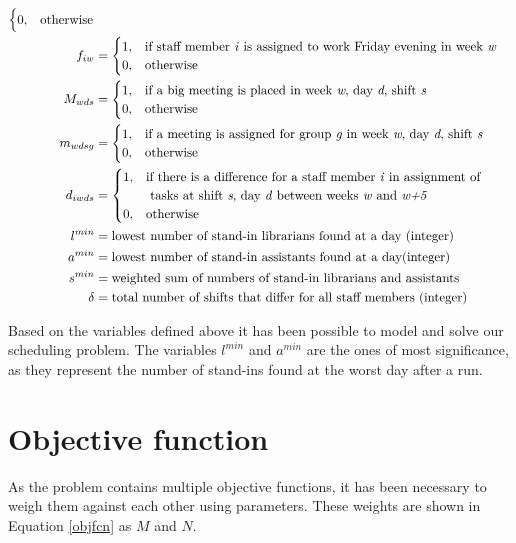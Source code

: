 \begin{align}
\begin{cases}
 		0, & \text{otherwise}
	\end{cases}
	\\
	f_{iw}&=
	\begin{cases}
 		1, & \text{if staff member \textit{i} is assigned to work Friday evening in week \textit{w}} \\
 		0, & \text{otherwise}
	\end{cases}	
	\\
	M_{wds}&=
	\begin{cases}
	 	1, & \text{if a big meeting is placed in week \textit{w}, day \textit{d}, shift \textit{s}} \\
	 	0, & \text{otherwise}
	\end{cases}
	\\
	m_{wdsg}&=
	\begin{cases}
	 	1, & \text{if a meeting is assigned for group \textit{g} in week \textit{w}, day \textit{d}, shift \textit{s}} \\
	 	0, & \text{otherwise}
	\end{cases}
	\\
	d_{iwds}&=
	\begin{cases}
	 	1, & \text{if there is a difference for a staff member \textit{i} in assignment of}\\
	 		& \text{ tasks at shift \textit{s}, day \textit{d} between weeks \textit{w} and \textit{w+5}} \\
	 	0, & \text{otherwise}
	\end{cases}
	\\
	l^{min}&= \text{lowest number of stand-in librarians found at a day (integer)} \\
	a^{min}&= \text{lowest number of stand-in assistants found at a day(integer)} \\
	s^{min}&= \text{weighted sum of numbers of stand-in librarians and assistants} \\
	\delta&= \text{total number of shifts that differ for all staff members (integer)}
\end{align}

Based on the variables defined above it has been possible to model and solve our scheduling problem. The variables \textit{$l^{min}$} and \textit{$a^{min}$} are the ones of most significance, as they represent the number of stand-ins found at the worst day after a run. 

\section{Objective function} \label{section:obj}
As the problem contains multiple objective functions, it has been necessary to weigh them against each other using parameters. These weights are shown in Equation \ref{objfcn} as $M$ and $N$.

